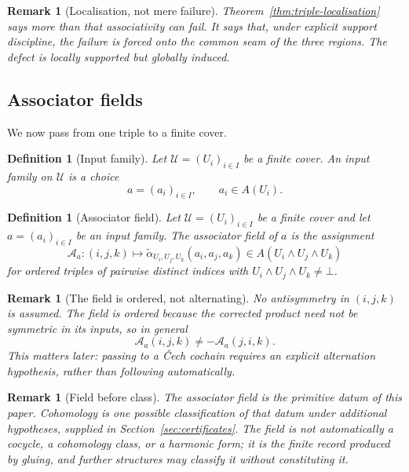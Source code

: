 \documentclass[11pt]{article}
\newtheorem{definition}[theorem]{Definition}
\newtheorem{remark}[theorem]{Remark}
\begin{document}
\begin{remark}[Localisation, not mere failure]
Theorem~\ref{thm:triple-localisation} says more than that associativity can fail. It says that, under explicit support discipline, the failure is forced onto the common seam of the three regions. The defect is locally supported but globally induced.
\end{remark}

\subsection{Associator fields}

We now pass from one triple to a finite cover.

\begin{definition}[Input family]
Let \(\mathcal U=(U_i)_{i\in I}\) be a finite cover. An input family on \(\mathcal U\) is a choice
\[
a=(a_i)_{i\in I},
\qquad
 a_i\in A(U_i).
\]
\end{definition}

\begin{definition}[Associator field]
Let \(\mathcal U=(U_i)_{i\in I}\) be a finite cover and let \(a=(a_i)_{i\in I}\) be an input family. The associator field of \(a\) is the assignment
\[
\mathcal A_a:(i,j,k)\longmapsto
\widetilde\alpha_{U_i,U_j,U_k}(a_i,a_j,a_k)
\in A(U_i\wedge U_j\wedge U_k)
\]
for ordered triples of pairwise distinct indices with \(U_i\wedge U_j\wedge U_k\neq \bot\).
\end{definition}

\begin{remark}[The field is ordered, not alternating]
No antisymmetry in \((i,j,k)\) is assumed. The field is ordered because the corrected product need not be symmetric in its inputs, so in general
\[
\mathcal A_a(i,j,k)\neq -\mathcal A_a(j,i,k).
\]
This matters later: passing to a \v{C}ech cochain requires an explicit alternation hypothesis, rather than following automatically.
\end{remark}

\begin{remark}[Field before class]
The associator field is the primitive datum of this paper. Cohomology is one possible classification of that datum under additional hypotheses, supplied in Section~\ref{sec:certificates}. The field is not automatically a cocycle, a cohomology class, or a harmonic form; it is the finite record produced by gluing, and further structures may classify it without constituting it.
\end{remark}
\end{document}

